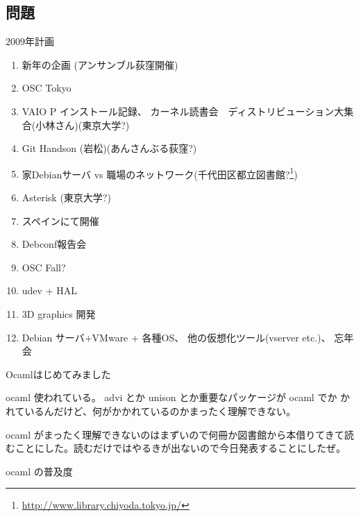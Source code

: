 \subsection{問題}


\begin{frame}{2009年計画}

{\scriptsize
 \begin{enumerate}
  \item 新年の企画 (アンサンブル荻窪開催)
  \item OSC Tokyo
  \item VAIO P インストール記録、
	カーネル読書会　ディストリビューション大集合(小林さん)(東京大学?)
  \item Git Handson (岩松)(あんさんぶる荻窪?)
  \item 家Debianサーバ vs 職場のネットワーク(千代田区都立図書館?\footnote{\url{http://www.library.chiyoda.tokyo.jp/}})
  \item Asterisk (東京大学?)
  \item スペインにて開催
  \item Debconf報告会
  \item OSC Fall?
  \item udev + HAL
  \item 3D graphics 開発 
  \item Debian サーバ+VMware + 各種OS、
	他の仮想化ツール(vserver etc.)、
	忘年会
 \end{enumerate}
}
\end{frame}



\begin{frame}{Ocamlはじめてみました}

ocaml 使われている。 advi とか unison とか重要なパッケージが ocaml でか
 かれているんだけど、何がかかれているのかまったく理解できない。

ocaml がまったく理解できないのはまずいので何冊か図書館から本借りてきて読
 むことにした。読むだけではやるきが出ないので今日発表することにしたぜ。
 
\end{frame}

\begin{frame}[containsverbatim]{ocaml の普及度}

\end{frame}

